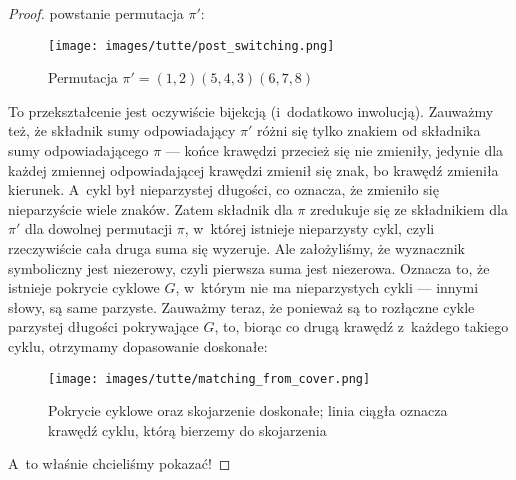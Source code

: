 \begin{proof}
	powstanie permutacja \(\pi'\):

	\begin{figure}[H]
		\centering
		\texttt{[image: images/tutte/post\_switching.png]}
		\caption{Permutacja \(\pi' = (1, 2)(5, 4, 3)(6, 7, 8)\)}
	\end{figure}

	To przekształcenie jest oczywiście bijekcją (i~dodatkowo inwolucją). Zauważmy też, że składnik sumy odpowiadający \(\pi'\) różni się tylko znakiem od składnika sumy odpowiadającego \(\pi\) --- końce krawędzi przecież się nie zmieniły, jedynie dla każdej zmiennej odpowiadającej krawędzi zmienił się znak, bo krawędź zmieniła kierunek. A~cykl był nieparzystej długości, co oznacza, że zmieniło się nieparzyście wiele znaków. Zatem składnik dla \(\pi\) zredukuje się ze składnikiem dla \(\pi'\) dla dowolnej permutacji \(\pi\), w~której istnieje nieparzysty cykl, czyli rzeczywiście cała druga suma się wyzeruje. Ale założyliśmy, że wyznacznik symboliczny jest niezerowy, czyli pierwsza suma jest niezerowa. Oznacza to, że istnieje pokrycie cyklowe \(G\), w~którym nie ma nieparzystych cykli --- innymi słowy, są same parzyste. Zauważmy teraz, że ponieważ są to rozłączne cykle parzystej długości pokrywające \(G\), to, biorąc co drugą krawędź z~każdego takiego cyklu, otrzymamy dopasowanie doskonałe:

	\begin{figure}[H]
		\centering
		\texttt{[image: images/tutte/matching\_from\_cover.png]}
		\caption{Pokrycie cyklowe oraz skojarzenie doskonałe; linia ciągła oznacza krawędź cyklu, którą bierzemy do skojarzenia }
	\end{figure}

	A~to właśnie chcieliśmy pokazać!
\end{proof}
